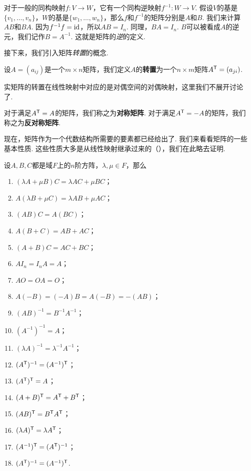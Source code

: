 对于一般的同构映射$f:V\to W$，它有一个同构逆映射$f^{-1}:W\to V$. 假设$V$的基是$\{v_1,\dots,v_n\}$，$W$的基是$\{w_1,\dots,w_n\}$，那么$f$和$f^{-1}$的矩阵分别是$A$和$B$. 我们来计算$AB$和$BA$. 因为$f^{-1}f=\mathrm{id}$，所以$AB=I_n$. 同理，$BA=I_n$. $B$可以被看成$A$的逆元，我们记作$B=A^{-1}$. 这就是矩阵的\emph{逆}的定义. 

接下来，我们引入矩阵\emph{转置}的概念. 

\begin{definition}[矩阵转置]
    设$A=(a_{ij})$是一个$m\times n$矩阵，我们定义$A$的\textbf{转置}为一个$n\times m$矩阵$A^{\mathsf{T}}=(a_{ji})$.
\end{definition}

实矩阵的转置在线性映射中对应的是对偶空间的对偶映射，这里我们不展开讨论了. 

对于满足$A^{\mathsf{T}}=A$的矩阵，我们称之为\textbf{对称矩阵}. 对于满足$A^{\mathsf{T}}=-A$的矩阵，我们称之为\textbf{反对称矩阵}. 

现在，矩阵作为一个代数结构所需要的要素都已经给出了. 我们来看看矩阵的一些基本性质. 这些性质大多是从线性映射继承过来的（），我们在此略去证明. 

\begin{proposition}\label{prop:mat-basic}
    设$A,B,C$都是域$F$上的$n$阶方阵，$\lambda,\mu\in F$，那么
    \begin{enumerate}
        \item $(\lambda A+\mu B)C=\lambda AC+\mu BC$；
        \item $A(\lambda B+\mu C)=\lambda AB+\mu AC$；
        \item $(AB)C=A(BC)$；
        \item $A(B+C)=AB+AC$；
        \item $(A+B)C=AC+BC$；
        \item $AI_n=I_nA=A$；
        \item $AO=OA=O$；
        \item $A(-B)=(-A)B=A(-B)=-(AB)$；
        \item $(AB)^{-1}=B^{-1}A^{-1}$；
        \item $(A^{-1})^{-1}=A$；
        \item $(\lambda A)^{-1}=\lambda^{-1}A^{-1}$；
        \item $(A^{\mathsf{T}} )^{-1}=(A^{-1})^{\mathsf{T}} $；
        \item $(A^{\mathsf{T}} )^{\mathsf{T}} =A$；
        \item $(A+B)^{\mathsf{T}} =A^{\mathsf{T}} +B^{\mathsf{T}} $；
        \item $(AB)^{\mathsf{T}} =B^{\mathsf{T}} A^{\mathsf{T}} $；
        \item $(\lambda A)^{\mathsf{T}} =\lambda A^{\mathsf{T}} $；
        \item $(A^{-1})^{\mathsf{T}} =(A^{\mathsf{T}} )^{-1}$；
        \item $(A^{\mathsf{T}} )^{-1}=(A^{-1})^{\mathsf{T}} $.
    \end{enumerate}
\end{proposition}


